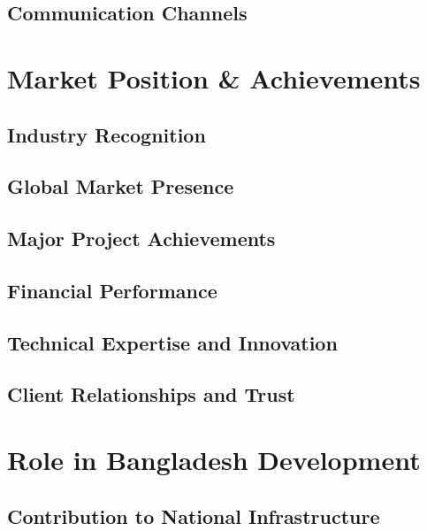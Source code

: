 \subsection{Communication Channels}

\section{Market Position \& Achievements}

\subsection{Industry Recognition}

\subsection{Global Market Presence}

\subsection{Major Project Achievements}

\subsection{Financial Performance}

\subsection{Technical Expertise and Innovation}

\subsection{Client Relationships and Trust}

\section{Role in Bangladesh Development}

\subsection{Contribution to National Infrastructure}

